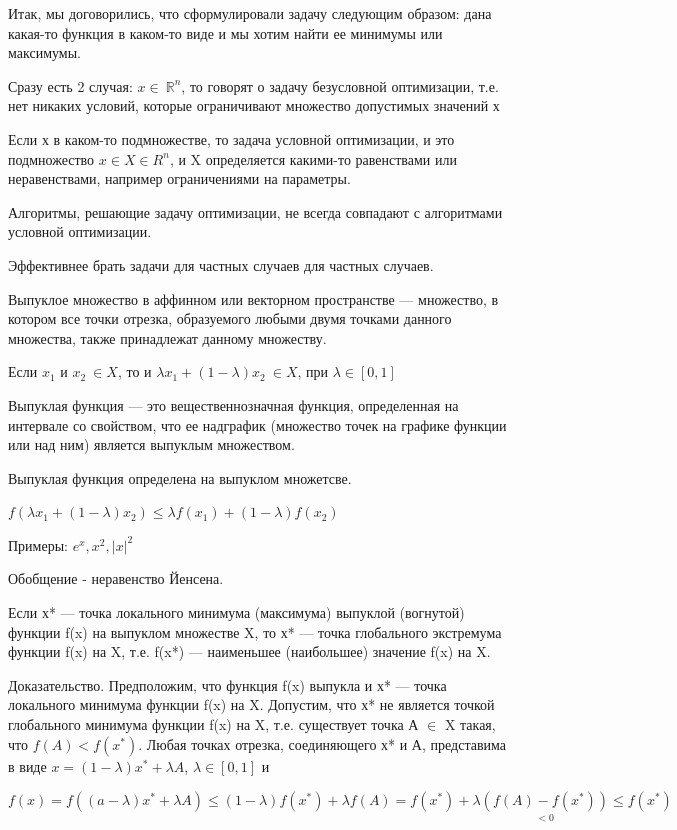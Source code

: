 \documentclass[a4paper, 12pt]{article}
\begin{document}
	Итак, мы договорились, что сформулировали задачу следующим образом: дана какая-то функция в каком-то виде и мы хотим найти ее минимумы или максимумы. 
	
	Сразу есть 2 случая: $x \in\ \mathbb {R}^n$, то говорят о задачу безусловной оптимизации, т.е. нет никаких условий, которые ограничивают множество допустимых значений х
	
	Если х в каком-то подмножестве, то задача условной оптимизации, и это подмножество $x\in X \in R^n$, и X определяется какими-то равенствами или неравенствами, например ограничениями на параметры. 
	
	Алгоритмы, решающие задачу оптимизации, не всегда совпадают с алгоритмами условной оптимизации. 
	
	Эффективнее брать задачи для частных случаев для частных случаев. 
	
	Выпуклое множество в аффинном или векторном пространстве — множество, в котором все точки отрезка, образуемого любыми двумя точками данного множества, также принадлежат данному множеству.
	
	Если $x_1$ и $x_2 \: \in X$, то и $\lambda x_1 + (1-\lambda)x_2 \: \in X$, при $\lambda \in [0, 1]$
	
	Выпуклая функция — это вещественнозначная функция, определенная на интервале со свойством, что ее надграфик (множество точек на графике функции или над ним) является выпуклым множеством.
	
	Выпуклая функция определена на выпуклом множетсве.
	
	$f(\lambda x_1 + (1-\lambda)x_2) \leq \lambda f(x_1) +(1-\lambda) f(x_2)$
	
	Примеры: $e^x, x^2, |x|^2$
	
	Обобщение - неравенство Йенсена.
	

	Если х* — точка локального минимума (максимума) выпуклой (вогнутой) функции f(x) на выпуклом множестве X, то х* — точка глобального экстремума функции f(x) на X, т.е. f(x*) — наименьшее (наибольшее) значение f(x) на X.
	
	Доказательство. Предположим, что функция f(x) выпукла и х* — точка локального минимума функции f(x) на X. Допустим, что х* не является точкой глобального минимума функции f(x) на X, т.е. существует точка А $\in$ X такая, что $f(A) < f(x^*)$. Любая точках отрезка, соединяющего х* и А, представима в виде $x = (1 - \lambda)x^* + \lambda A$, $\lambda \in [0, 1]$ и 
	
	$f(x) = f((a-\lambda)x^*+\lambda A)\leq (1-\lambda) f(x^*) + \lambda f(A) = f(x^*) + \lambda \underset{<0}{(f(A) -f(x^*))} \leq f(x^*)$
	
\end{document}
